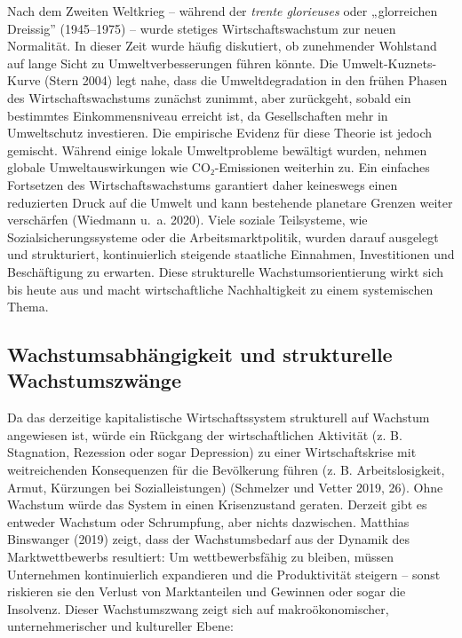 \documentclass[
  nswissgerman,
  a4paper,
  openany]{book}
\begin{document}
Nach dem Zweiten Weltkrieg -- während der \emph{trente glorieuses} oder
„glorreichen Dreissig'' (1945--1975) -- wurde stetiges
Wirtschaftswachstum zur neuen Normalität. In dieser Zeit wurde häufig
diskutiert, ob zunehmender Wohlstand auf lange Sicht zu
Umweltverbesserungen führen könnte. Die Umwelt-Kuznets-Kurve (Stern
2004) legt nahe, dass die Umweltdegradation in den frühen Phasen des
Wirtschaftswachstums zunächst zunimmt, aber zurückgeht, sobald ein
bestimmtes Einkommensniveau erreicht ist, da Gesellschaften mehr in
Umweltschutz investieren. Die empirische Evidenz für diese Theorie ist
jedoch gemischt. Während einige lokale Umweltprobleme bewältigt wurden,
nehmen globale Umweltauswirkungen wie CO₂-Emissionen weiterhin zu. Ein
einfaches Fortsetzen des Wirtschaftswachstums garantiert daher
keineswegs einen reduzierten Druck auf die Umwelt und kann bestehende
planetare Grenzen weiter verschärfen (Wiedmann u.~a. 2020). Viele
soziale Teilsysteme, wie Sozialsicherungssysteme oder die
Arbeitsmarktpolitik, wurden darauf ausgelegt und strukturiert,
kontinuierlich steigende staatliche Einnahmen, Investitionen und
Beschäftigung zu erwarten. Diese strukturelle Wachstumsorientierung
wirkt sich bis heute aus und macht wirtschaftliche Nachhaltigkeit zu
einem systemischen Thema.

\subsection{Wachstumsabhängigkeit und strukturelle
Wachstumszwänge}\label{wachstumsabhuxe4ngigkeit-und-strukturelle-wachstumszwuxe4nge}

Da das derzeitige kapitalistische Wirtschaftssystem strukturell auf
Wachstum angewiesen ist, würde ein Rückgang der wirtschaftlichen
Aktivität (z. B. Stagnation, Rezession oder sogar Depression) zu einer
Wirtschaftskrise mit weitreichenden Konsequenzen für die Bevölkerung
führen (z. B. Arbeitslosigkeit, Armut, Kürzungen bei Sozialleistungen)
(Schmelzer und Vetter 2019, 26). Ohne Wachstum würde das System in einen
Krisenzustand geraten. Derzeit gibt es entweder Wachstum oder
Schrumpfung, aber nichts dazwischen. Matthias Binswanger (2019) zeigt,
dass der Wachstumsbedarf aus der Dynamik des Marktwettbewerbs
resultiert: Um wettbewerbsfähig zu bleiben, müssen Unternehmen
kontinuierlich expandieren und die Produktivität steigern -- sonst
riskieren sie den Verlust von Marktanteilen und Gewinnen oder sogar die
Insolvenz. Dieser Wachstumszwang zeigt sich auf makroökonomischer,
unternehmerischer und kultureller Ebene:
\end{document}
